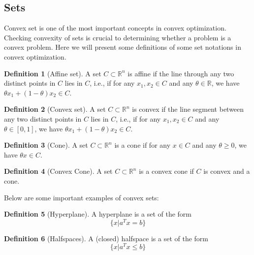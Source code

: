 \documentclass[
]{book}
\theoremstyle{definition}
\newtheorem{definition}{Definition}[chapter]
\theoremstyle{definition}
\theoremstyle{definition}
\theoremstyle{definition}
\theoremstyle{remark}
\begin{document}
\subsection{Sets}\label{sets}

Convex set is one of the most important concepts in convex optimization. Checking convexity of sets is crucial to determining whether a problem is a convex problem. Here we will present some definitions of some set notations in convex optimization.

\begin{definition}[Affine set]
\protect\hypertarget{def:affineset}{}\label{def:affineset}A set \(C\subset \mathbb{R}^n\) is affine if the line through any two distinct points in \(C\) lies in \(C\), i.e., if for any \(x_1,x_2 \in C\) and any \(\theta \in \mathbb{R}\), we have \(\theta x_1 + (1-\theta)x_2 \in C\).
\end{definition}

\begin{definition}[Convex set]
\protect\hypertarget{def:convexset}{}\label{def:convexset}A set \(C\subset \mathbb{R}^n\) is convex if the line segment between any two distinct points in \(C\) lies in \(C\), i.e., if for any \(x_1,x_2 \in C\) and any \(\theta \in [0,1]\), we have \(\theta x_1 + (1-\theta)x_2 \in C\).
\end{definition}

\begin{definition}[Cone]
\protect\hypertarget{def:cone}{}\label{def:cone}A set \(C\subset \mathbb{R}^n\) is a cone if for any \(x\in C\) and any \(\theta\geq 0\), we have \(\theta x \in C\).
\end{definition}

\begin{definition}[Convex Cone]
\protect\hypertarget{def:convexcone}{}\label{def:convexcone}A set \(C\subset \mathbb{R}^n\) is a convex cone if \(C\) is convex and a cone.
\end{definition}

Below are some important examples of convex sets:

\begin{definition}[Hyperplane]
\protect\hypertarget{def:hyperplane}{}\label{def:hyperplane}A hyperplane is a set of the form \[\{x|a^Tx = b\}\]
\end{definition}

\begin{definition}[Halfspaces]
\protect\hypertarget{def:halfspaces}{}\label{def:halfspaces}A (closed) halfspace is a set of the form \[\{x|a^Tx \leq b\}\]
\end{definition}
\end{document}
